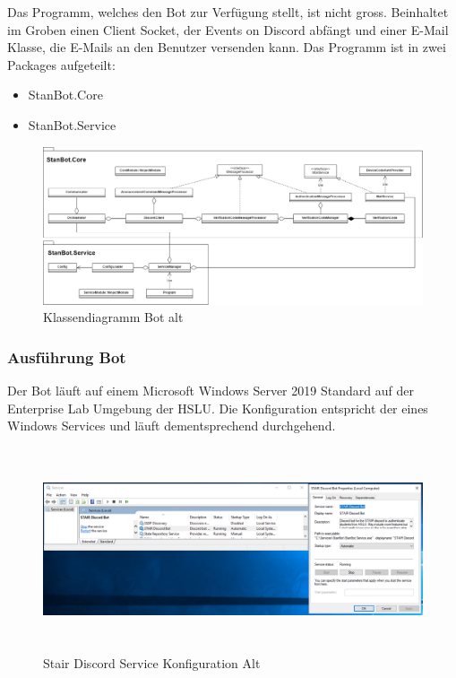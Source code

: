 \documentclass[a4paper, table]{article}
\begin{document}
Das Programm, welches den Bot zur Verfügung stellt, ist nicht gross. 
Beinhaltet im Groben einen Client Socket, der Events on Discord abfängt und einer E-Mail Klasse, die E-Mails an den Benutzer versenden kann. 
Das Programm ist in zwei Packages aufgeteilt:
\begin{itemize}
    \item StanBot.Core
    \item StanBot.Service
\end{itemize}
\clearpage

\begin{figure}[ht]
    \centering
    \hspace*{-1.5cm}
    \includegraphics[width=1.2\textwidth]{img/Klassendiagramm_Bot_alt.png}
    \caption{Klassendiagramm Bot alt}
    \label{fig:Klassendiagramm_Bot_alt}
\end{figure}

\subsubsection{Ausführung Bot}
Der Bot läuft auf einem Microsoft Windows Server 2019 Standard auf der Enterprise Lab Umgebung der HSLU. 
Die Konfiguration entspricht der eines Windows Services und läuft dementsprechend durchgehend.

\begin{figure}[hb]
    \centering
    \hspace*{-2.5cm}
    \includegraphics[width=1.3\textwidth,height=6cm]{img/Discord_Bot_old_service_configuration.png}
    \caption{Stair Discord Service Konfiguration Alt}
    \label{fig:bot-service-configuration-old}
\end{figure}
\clearpage
\end{document}
